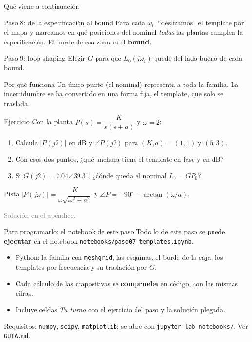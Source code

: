 \documentclass[aspectratio=169,11pt]{beamer}
\begin{document}
\begin{frame}{Qué viene a continuación}
  \small
  \begin{block}{Paso 8: de la especificación al bound}
    Para cada $\omega_i$, ``deslizamos'' el template por el mapa y marcamos en qué posiciones del nominal \emph{todas} las plantas cumplen la especificación. El borde de esa zona es el \textbf{bound}.
  \end{block}
  \begin{block}{Paso 9: loop shaping}
    Elegir $G$ para que $L_0(j\omega_i)$ quede del lado bueno de cada bound.
  \end{block}
  \begin{alertblock}{Por qué funciona}
    Un único punto (el nominal) representa a toda la familia. La incertidumbre se ha convertido en una forma fija, el template, que solo se traslada.
  \end{alertblock}
\end{frame}

\begin{frame}{Ejercicio}
  \small
  Con la planta $P(s)=\dfrac{K}{s(s+a)}$ y $\omega=2$:
  \begin{enumerate}
    \item Calcula $|P(j2)|$ en dB y $\angle P(j2)$ para $(K,a)=(1,1)$ y $(5,3)$.
    \item Con esos dos puntos, ¿qué anchura tiene el template en fase y en dB?
    \item Si $G(j2)=7.04\angle39.3^\circ$, ¿dónde queda el nominal $L_0=GP_0$?
  \end{enumerate}
  \begin{block}{Pista}
    $|P(j\omega)|=\dfrac{K}{\omega\sqrt{\omega^2+a^2}}$ y $\angle P=-90^\circ-\arctan(\omega/a)$.
  \end{block}
  \textcolor{gray}{Solución en el apéndice.}
\end{frame}

\begin{frame}{Para programarlo: el notebook de este paso}
  \small
  Todo lo de este paso se puede \textbf{ejecutar} en el notebook \texttt{notebooks/paso07\_templates.ipynb}.
  \begin{itemize}
    \item Python: la familia con \texttt{meshgrid}, las esquinas, el borde de la caja, los templates por frecuencia y su traslación por $G$.
    \item Cada cálculo de las diapositivas se \textbf{comprueba} en código, con las mismas cifras.
    \item Incluye celdas \emph{Tu turno} con el ejercicio del paso y la solución plegada.
  \end{itemize}
  \footnotesize Requisitos: \texttt{numpy}, \texttt{scipy}, \texttt{matplotlib}; se abre con \texttt{jupyter lab notebooks/}. Ver \texttt{GUIA.md}.
\end{frame}
\end{document}
